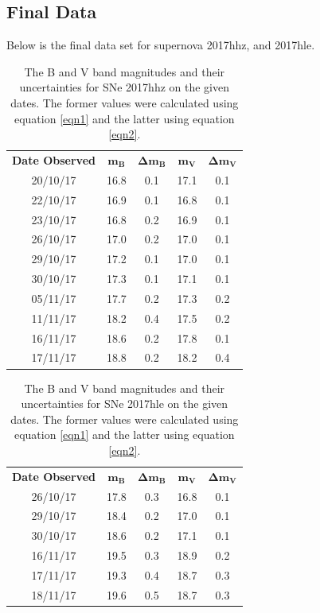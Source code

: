 \documentclass[twocolumn]{revtex4}
\begin{document}
\vspace{-3ex}
\subsection{Final Data}
\vspace{-2ex}

Below is the final data set for supernova 2017hhz, and 2017hle. 

\begin{table}[h!]
\centering
\begin{tabular}{c@{\hskip 20pt}c@{\hskip 20pt}c@{\hskip 20pt}c@{\hskip 20pt}c} 
 \hline
 \textbf{Date Observed} & \textbf{$\boldsymbol{m_B}$} & \textbf{$\boldsymbol{\Delta{m_B}}$} & \textbf{$\boldsymbol{m_V}$} & \textbf{$\boldsymbol{\Delta{m_V}}$} \\ [0.5ex] 
 20/10/17 & 16.8 & 0.1 & 17.1 & 0.1 \\
 22/10/17 & 16.9 & 0.1 & 16.8 & 0.1 \\
 23/10/17 & 16.8 & 0.2 & 16.9 & 0.1 \\
 26/10/17 & 17.0 & 0.2 & 17.0 & 0.1 \\
 29/10/17 & 17.2 & 0.1 & 17.0 & 0.1 \\
 30/10/17 & 17.3 & 0.1 & 17.1 & 0.1 \\
 05/11/17 & 17.7 & 0.2 & 17.3 & 0.2 \\
 11/11/17 & 18.2 & 0.4 & 17.5 & 0.2 \\
 16/11/17 & 18.6 & 0.2 & 17.8 & 0.1 \\
 17/11/17 & 18.8 & 0.2 & 18.2 & 0.4 \\
 \hline
\end{tabular}
\caption{The B and V band magnitudes and their uncertainties for SNe 2017hhz on the given dates. The former values were calculated using equation \ref{eqn1} and the latter using equation \ref{eqn2}.}
\label{2017hhz-table}
\end{table}

\begin{table}[h!]
\centering
\begin{tabular}{c@{\hskip 20pt}c@{\hskip 20pt}c@{\hskip 20pt}c@{\hskip 20pt}c} 
 \hline
 \textbf{Date Observed} & \textbf{$\boldsymbol{m_B}$} & \textbf{$\boldsymbol{\Delta{m_B}}$} & \textbf{$\boldsymbol{m_V}$} & \textbf{$\boldsymbol{\Delta{m_V}}$} \\ [0.5ex] 
 26/10/17 & 17.8 & 0.3 & 16.8 & 0.1 \\
 29/10/17 & 18.4 & 0.2 & 17.0 & 0.1 \\
 30/10/17 & 18.6 & 0.2 & 17.1 & 0.1 \\
 16/11/17 & 19.5 & 0.3 & 18.9 & 0.2 \\
 17/11/17 & 19.3 & 0.4 & 18.7 & 0.3 \\
 18/11/17 & 19.6 & 0.5 & 18.7 & 0.3 \\
 \hline
\end{tabular}
\caption{The B and V band magnitudes and their uncertainties for SNe 2017hle on the given dates. The former values were calculated using equation \ref{eqn1} and the latter using equation \ref{eqn2}.}
\label{2017hle-table}
\end{table}
\end{document}

